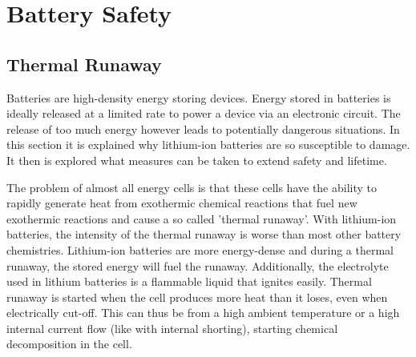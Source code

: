 \section{Battery Safety}
\label{Chap:Battery_Safety}
\subsection{Thermal Runaway}
Batteries are high-density energy storing devices. Energy stored in batteries is ideally released at a limited rate to power a device via an electronic circuit. The release of too much energy however leads to potentially dangerous situations. In this section it is explained why lithium-ion batteries are so susceptible to damage. It then is explored what measures can be taken to extend safety and lifetime.

The problem of almost all energy cells is that these cells have the ability to rapidly generate heat from exothermic chemical reactions that fuel new exothermic reactions and cause a so called 'thermal runaway'. With lithium-ion batteries, the intensity of the thermal runaway is worse than most other battery chemistries. Lithium-ion batteries are more energy-dense and during a thermal runaway, the stored energy will fuel the runaway. Additionally, the electrolyte used in lithium batteries is a flammable liquid that ignites easily\cite{Mikolajczak2011}. Thermal runaway is started when the cell produces more heat than it loses, even when electrically cut-off. This can thus be from a high ambient temperature or a high internal current flow (like with internal shorting),  starting chemical decomposition in the cell.

